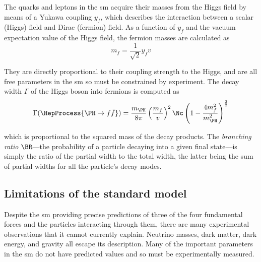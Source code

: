 The quarks and leptons in the \acrshort{sm} acquire their masses from the Higgs field by means of a Yukawa coupling $y_f$, which describes the interaction between a scalar (Higgs) field and Dirac (fermion) field. As a function of $y_f$ and the vacuum expectation value of the Higgs field, the fermion masses are calculated as
\begin{equation}
    m_f = \frac{1}{\sqrt{2}} y_f v
    \label{eq:fermion_mass}
\end{equation}

They are directly proportional to their coupling strength to the Higgs, and are all free parameters in the \acrshort{sm} so must be constrained by experiment. The decay width $\Gamma$ of the Higgs boson into fermions is computed as
\begin{equation}
    \Gamma(\HepProcess{\PH \to f\bar{f}}) = \frac{m_{\PH}}{8\pi} \left( \frac{m_f}{v} \right)^2 \Nc \left( 1 - \frac{4 m_f^2}{m_{\PH}^2} \right)^{\frac{3}{2}}
    \label{eq:higgs_decay_width_fermions}
\end{equation}

which is proportional to the squared mass of the decay products. The \emph{branching ratio} $\BR$---the probability of a particle decaying into a given final state---is simply the ratio of the partial width to the total width, the latter being the sum of partial widths for all the particle's decay modes.




\subsection{Limitations of the standard model}
\label{subsec:sm_limitations}


Despite the \acrlong{sm} providing precise predictions of three of the four fundamental forces and the particles interacting through them, there are many experimental observations that it cannot currently explain. Neutrino masses, dark matter, dark energy, and gravity all escape its description. Many of the important parameters in the \acrshort{sm} do not have predicted values and so must be experimentally measured.

